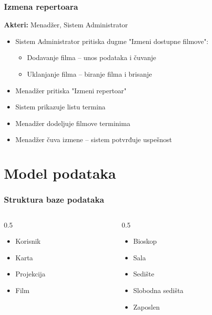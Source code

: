 \documentclass{beamer}
\begin{document}
\begin{frame}
\frametitle{Izmena repertoara}
\textbf{Akteri:} Menadžer, Sistem Administrator

\vspace{8pt}
\begin{itemize}
\item Sistem Administrator pritiska dugme "Izmeni dostupne filmove":
  \begin{itemize}
  \item Dodavanje filma -- unos podataka i čuvanje
  \item Uklanjanje filma -- biranje filma i brisanje 
  \end{itemize}
\item Menadžer pritiska "Izmeni repertoar"
\item Sistem prikazuje listu termina
\item Menadžer dodeljuje filmove terminima
\item Menadžer čuva izmene -- sistem potvrđuje uspešnost
\end{itemize}
\end{frame}

\section{Model podataka}

\begin{frame}
\frametitle{Struktura baze podataka}
\begin{columns}
\begin{column}{0.5\textwidth}
\begin{itemize}
\item Korisnik
\item Karta
\item Projekcija
\item Film
\end{itemize}
\end{column}
\begin{column}{0.5\textwidth}
\begin{itemize}
\item Bioskop
\item Sala
\item Sedište
\item Slobodna sedišta
\item Zaposlen
\end{itemize}
\end{column}
\end{columns}
\end{frame}
\end{document}
